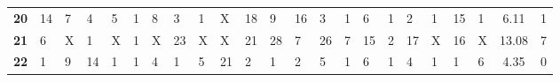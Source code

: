 \begin{table}[t]
\begin{adjustbox}{width=\textwidth}
\begin{tabular}{|c|llllllllllllllllllll|c|c|}
\textbf{20}          & {\color{blue} 14} & {\color{blue} 7}                      & {\color{blue} 4}                      & {\color{blue} 5}                      & {\color{blue} 1}                      & {\color{blue} 8}                      & {\color{blue} 3}  & {\color{blue} 1}                      & {\color{red} X} & {\color{blue} 18}                     & {\color{blue} 9}                      & {\color{blue} 16}                     & {\color{blue} 3}                      & {\color{blue} 1}                      & {\color{blue} 6}                      & {\color{blue} 1}                      & {\color{blue} 2}                      & {\color{blue} 1}                      & {\color{blue} 15}                     & {\color{blue} 1}                      & 6.11                                                & 1                                                   \\
\textbf{21}          & {\color{blue} 6}  & {\color{red} X} & {\color{blue} 1}                      & {\color{red} X} & {\color{blue} 1}                      & {\color{red} X} & {\color{blue} 23} & {\color{red} X} & {\color{red} X} & {\color{blue} 21}                     & {\color{blue} 28}                     & {\color{blue} 7}                      & {\color{blue} 26}                     & {\color{blue} 7}                      & {\color{blue} 15}                     & {\color{blue} 2}                      & {\color{blue} 17}                     & {\color{red} X} & {\color{blue} 16}                     & {\color{red} X} & 13.08                                               & 7                                                   \\
\textbf{22}          & {\color{blue} 1}  & {\color{blue} 9}                      & {\color{blue} 14}                     & {\color{blue} 1}                      & {\color{blue} 1}                      & {\color{blue} 4}                      & {\color{blue} 1}  & {\color{blue} 5}                      & {\color{blue} 21}                     & {\color{blue} 2}                      & {\color{blue} 1}                      & {\color{blue} 2}                      & {\color{blue} 5}                      & {\color{blue} 1}                      & {\color{blue} 6}                      & {\color{blue} 1}                      & {\color{blue} 4}                      & {\color{blue} 1}                      & {\color{blue} 1}                      & {\color{blue} 6}                      & 4.35                                                & 0                                                   \\

\end{tabular}
\end{adjustbox}
\end{table}
